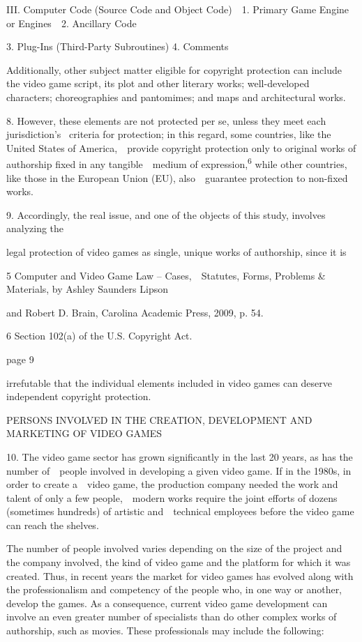 \documentclass[
]{article}
\begin{document}
{III. Computer Code (Source Code and Object Code)~~1. Primary Game
Engine or Engines~~2. Ancillary Code}

{3. Plug-Ins (Third-Party Subroutines) 4. Comments}

{Additionally, other subject matter eligible for copyright protection
can include the video game script, its plot and other literary works;
well-developed characters; choreographies and pantomimes; and maps and
architectural works.}

{8. }{However, these elements are not protected }{per se}{, unless they
meet each jurisdiction's }{~criteria for protection; in this regard,
some countries, like the United States of America,~~provide copyright
protection only to original works of authorship fixed in any
tangible~~medium of expression,}\textsuperscript{{6 }}{while other
countries, like those in the European Union (EU), also~~guarantee
protection to non-fixed works.}

{9. }{Accordingly, the real issue, and one of the objects of this study,
involves analyzing the}

{legal protection of video games as single, unique works of authorship,
since it is}

{5 }{Computer and Video Game Law }{-- }{Cases,~~Statutes, Forms,
Problems \& Materials}{, by Ashley Saunders Lipson}

{and Robert D. Brain, Carolina Academic Press, 2009, p. 54.}

{6 }{Section 102(a) of the }{U.S. Copyright Act}{.}

{page 9}

{irrefutable that the individual elements included in video games can
deserve independent copyright protection.}

{PERSONS INVOLVED IN THE CREATION, DEVELOPMENT AND MARKETING OF VIDEO
GAMES}

{10. }{The video game sector has grown significantly in the last 20
years, as has the number of~~people involved in developing a given video
game. If in the 1980s, in order to create a~~video game, the production
company needed the work and talent of only a few people,~~modern works
require the joint efforts of dozens (sometimes hundreds) of artistic
and~~technical employees before the video game can reach the shelves.}

{The number of people involved varies depending on the size of the
project and the company involved, the kind of video game and the
platform for which it was created. Thus, in recent years the market for
video games has evolved along with the professionalism and competency of
the people who, in one way or another, develop the games. As a
consequence, current video game development can involve an even greater
number of specialists than do other complex works of authorship, such as
movies. These professionals may include the following:}
\end{document}
